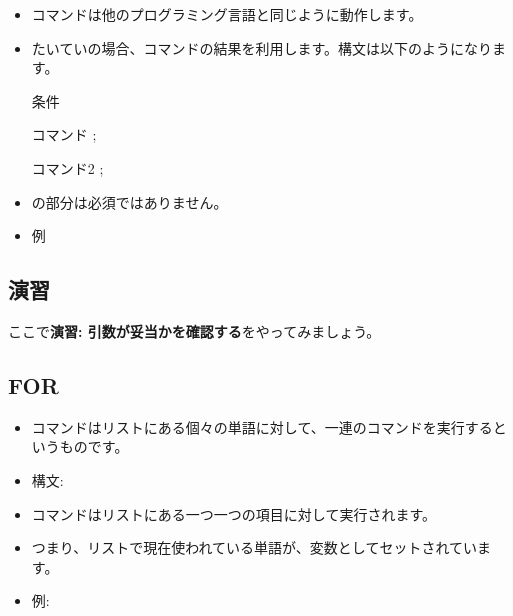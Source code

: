 \documentclass{jsarticle}
\begin{document}
\begin{itemize}

\item {\color{red}}コマンドは他のプログラミング言語と同じように動作します。
\item たいていの場合、{\color{red}}コマンドの結果を利用します。構文は以下のようになります。

\bigskip

{\color{red}\Q{if [}} 条件 {\color{red}\Q{] ; then}}

コマンド ;

{\color{red}}
 
コマンド2 ;

{\color{red}}

\bigskip

\item {\color{red}}の部分は必須ではありません。

\item 例
{\color{red}{\tt

if [ \$a = 2 ] ; then

　b="y-axis";

fi 
}}

\end{itemize}




\subsection*{演習}

ここで{\bf 演習: 引数が妥当かを確認する}をやってみましょう。




\subsection{FOR}


\begin{itemize}
\item {\color{red}}コマンドはリストにある個々の単語に対して、一連のコマンドを実行するというものです。
\item 構文:

{\color{red}{\tt
for 変数 in 値のリスト ; do

　　コマンド ;

done 
}}

\bigskip

\item コマンドはリストにある一つ一つの項目に対して実行されます。
\item つまり、リストで現在使われている単語が、変数としてセットされています。

\bigskip

\item 例:

{}

\end{itemize}
\end{document}
